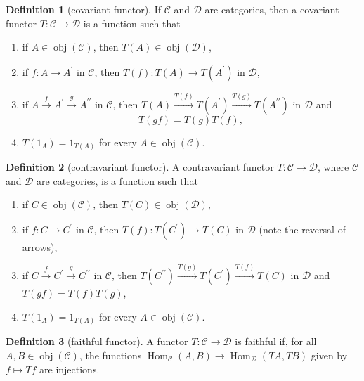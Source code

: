 \documentclass[a4paper,12pt]{article}
\theoremstyle{definition}
\newtheorem{defn}{Definition}[subsection]
\begin{document}
\begin{defn}[covariant functor]
    If $\mathcal{C}$ and $\mathcal{D}$ are categories, then a covariant functor $T: \mathcal{C} \rightarrow \mathcal{D}$ is a function such that
    \begin{enumerate}[(1)]
        \item if $A \in \operatorname{obj}(\mathcal{C})$, then $T(A) \in \operatorname{obj}(\mathcal{D})$,
        \item if $f: A \rightarrow A^{\prime}$ in $\mathcal{C}$, then $T(f): T(A) \rightarrow T\left(A^{\prime}\right)$ in $\mathcal{D}$,
        \item if $A \stackrel{f}{\rightarrow} A^{\prime} \stackrel{g}{\rightarrow} A^{\prime \prime}$ in $\mathcal{C}$, then $T(A) \stackrel{T(f)}{\rightarrow} T\left(A^{\prime}\right) \stackrel{T(g)}{\rightarrow} T\left(A^{\prime \prime}\right)$ in $\mathcal{D}$ and
              $$
                  T(g f)=T(g) T(f),
              $$
        \item $T\left(1_A\right)=1_{T(A)}$ for every $A \in \operatorname{obj}(\mathcal{C})$.
    \end{enumerate}
\end{defn}
\begin{defn}[contravariant functor]
    A contravariant functor $T: \mathcal{C} \rightarrow \mathcal{D}$, where $\mathcal{C}$ and $\mathcal{D}$ are categories, is a function such that
    \begin{enumerate}[(1)]
        \item if $C \in \operatorname{obj}(\mathcal{C})$, then $T(C) \in \operatorname{obj}(\mathcal{D})$,
        \item if $f: C \rightarrow C^{\prime}$ in $\mathcal{C}$, then $T(f): T\left(C^{\prime}\right) \rightarrow T(C)$ in $\mathcal{D}$ (note the reversal of arrows),
        \item if $C \stackrel{f}{\rightarrow} C^{\prime} \stackrel{g}{\rightarrow} C^{\prime \prime}$ in $\mathcal{C}$, then $T\left(C^{\prime \prime}\right) \stackrel{T(g)}{\rightarrow} T\left(C^{\prime}\right) \stackrel{T(f)}{\rightarrow} T(C)$ in $\mathcal{D}$ and $T(g f)=T(f) T(g)$,
        \item $T\left(1_A\right)=1_{T(A)}$ for every $A \in \operatorname{obj}(\mathcal{C})$.
    \end{enumerate}
\end{defn}
\begin{defn}[faithful functor]
    A functor $T: \mathcal{C} \rightarrow \mathcal{D}$ is faithful if, for all $A, B \in \operatorname{obj}(\mathcal{C})$, the functions $\operatorname{Hom}_{\mathcal{C}}(A, B) \rightarrow \operatorname{Hom}_{\mathcal{D}}(T A, T B)$ given by $f \mapsto T f$ are injections.
\end{defn}
\end{document}
